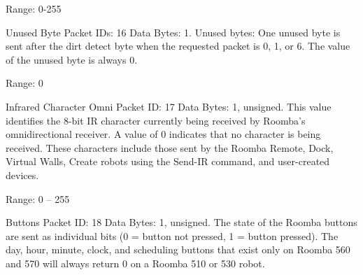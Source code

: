 \begin{Desc}
\begin{description}
Range\+: 0-\/255 \item[{\em 
\hypertarget{group__roomba-lib_gga46f008b5055c4a08d3123c6a3478373eabb1001411d09b705509b3683150b6f5f}{}R\+O\+O\+M\+B\+A\+\_\+\+U\+N\+U\+S\+E\+D\+\_\+1\label{group__roomba-lib_gga46f008b5055c4a08d3123c6a3478373eabb1001411d09b705509b3683150b6f5f}
}]Unused Byte Packet I\+Ds\+: 16 Data Bytes\+: 1. Unused bytes\+: One unused byte is sent after the dirt detect byte when the requested packet is 0, 1, or 6. The value of the unused byte is always 0.

Range\+: 0 \item[{\em 
\hypertarget{group__roomba-lib_gga46f008b5055c4a08d3123c6a3478373ea2643c115b4c5cf1851b3d80917a49015}{}R\+O\+O\+M\+B\+A\+\_\+\+I\+R\+\_\+\+O\+P\+C\+O\+D\+E\label{group__roomba-lib_gga46f008b5055c4a08d3123c6a3478373ea2643c115b4c5cf1851b3d80917a49015}
}]Infrared Character Omni Packet I\+D\+: 17 Data Bytes\+: 1, unsigned. This value identifies the 8-\/bit I\+R character currently being received by Roomba’s omnidirectional receiver. A value of 0 indicates that no character is being received. These characters include those sent by the Roomba Remote, Dock, Virtual Walls, Create robots using the Send-\/\+I\+R command, and user-\/created devices.

Range\+: 0 – 255 \item[{\em 
\hypertarget{group__roomba-lib_gga46f008b5055c4a08d3123c6a3478373ea384322ca8586075fed5c6a4a6c8d45a2}{}R\+O\+O\+M\+B\+A\+\_\+\+B\+U\+T\+T\+O\+N\+S\+\_\+\+P\+K\+T\label{group__roomba-lib_gga46f008b5055c4a08d3123c6a3478373ea384322ca8586075fed5c6a4a6c8d45a2}
}]Buttons Packet I\+D\+: 18 Data Bytes\+: 1, unsigned. The state of the Roomba buttons are sent as individual bits (0 = button not pressed, 1 = button pressed). The day, hour, minute, clock, and scheduling buttons that exist only on Roomba 560 and 570 will always return 0 on a Roomba 510 or 530 robot.


\end{description}
\end{Desc}
